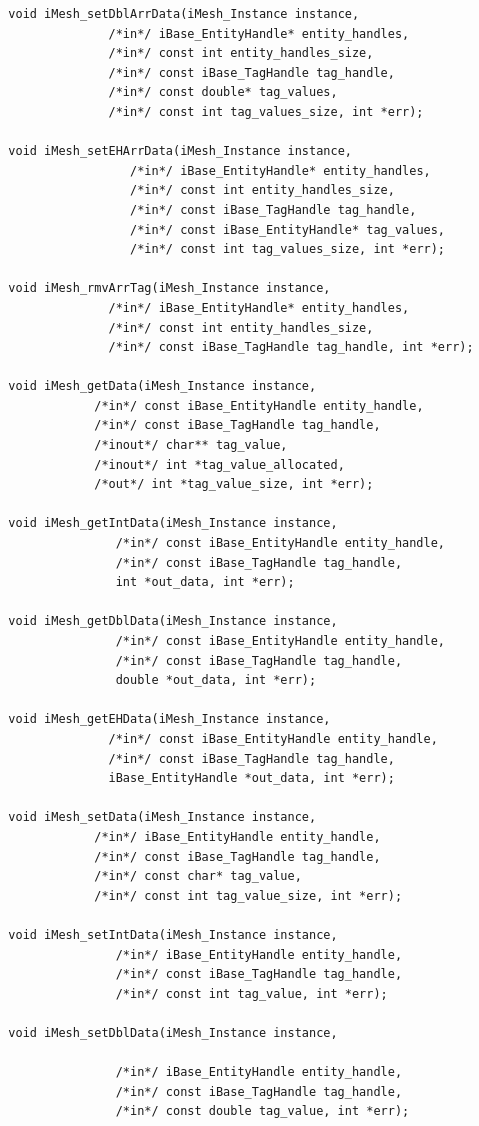 \documentclass{article}
\begin{document}
\begin{small}
\begin{verbatim}
  void iMesh_setDblArrData(iMesh_Instance instance,
				/*in*/ iBase_EntityHandle* entity_handles,
				/*in*/ const int entity_handles_size,
				/*in*/ const iBase_TagHandle tag_handle,
				/*in*/ const double* tag_values,
				/*in*/ const int tag_values_size, int *err);

  void iMesh_setEHArrData(iMesh_Instance instance,
			       /*in*/ iBase_EntityHandle* entity_handles,
			       /*in*/ const int entity_handles_size,
			       /*in*/ const iBase_TagHandle tag_handle,
			       /*in*/ const iBase_EntityHandle* tag_values,
			       /*in*/ const int tag_values_size, int *err);

  void iMesh_rmvArrTag(iMesh_Instance instance,
			    /*in*/ iBase_EntityHandle* entity_handles,
			    /*in*/ const int entity_handles_size,
			    /*in*/ const iBase_TagHandle tag_handle, int *err);

  void iMesh_getData(iMesh_Instance instance,
			  /*in*/ const iBase_EntityHandle entity_handle,
			  /*in*/ const iBase_TagHandle tag_handle,
			  /*inout*/ char** tag_value,
			  /*inout*/ int *tag_value_allocated,
			  /*out*/ int *tag_value_size, int *err);

  void iMesh_getIntData(iMesh_Instance instance,
			     /*in*/ const iBase_EntityHandle entity_handle,
			     /*in*/ const iBase_TagHandle tag_handle,
			     int *out_data, int *err);

  void iMesh_getDblData(iMesh_Instance instance,
			     /*in*/ const iBase_EntityHandle entity_handle,
			     /*in*/ const iBase_TagHandle tag_handle,
			     double *out_data, int *err);

  void iMesh_getEHData(iMesh_Instance instance,
			    /*in*/ const iBase_EntityHandle entity_handle,
			    /*in*/ const iBase_TagHandle tag_handle,
			    iBase_EntityHandle *out_data, int *err);

  void iMesh_setData(iMesh_Instance instance,
			  /*in*/ iBase_EntityHandle entity_handle,
			  /*in*/ const iBase_TagHandle tag_handle,
			  /*in*/ const char* tag_value,
			  /*in*/ const int tag_value_size, int *err);

  void iMesh_setIntData(iMesh_Instance instance,
			     /*in*/ iBase_EntityHandle entity_handle,
			     /*in*/ const iBase_TagHandle tag_handle,
			     /*in*/ const int tag_value, int *err);

  void iMesh_setDblData(iMesh_Instance instance,

			     /*in*/ iBase_EntityHandle entity_handle,
			     /*in*/ const iBase_TagHandle tag_handle,
			     /*in*/ const double tag_value, int *err);


\end{verbatim}
\end{small}
\end{document}
